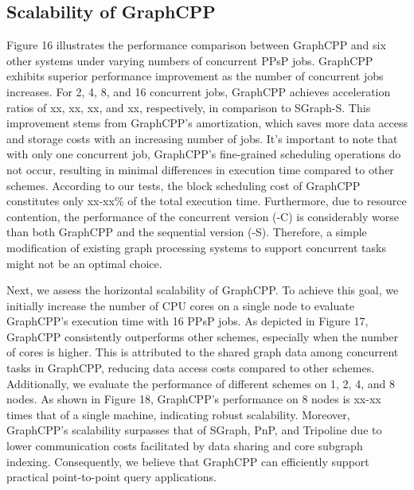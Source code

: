\documentclass[lettersize,journal]{IEEEtran} %
\begin{document}
\subsection{Scalability of GraphCPP}
Figure 16 illustrates the performance comparison between GraphCPP and six other systems under varying numbers of concurrent PPsP jobs. GraphCPP exhibits superior performance improvement as the number of concurrent jobs increases. For 2, 4, 8, and 16 concurrent jobs, GraphCPP achieves acceleration ratios of xx, xx, xx, and xx, respectively, in comparison to SGraph-S. This improvement stems from GraphCPP's amortization, which saves more data access and storage costs with an increasing number of jobs. It's important to note that with only one concurrent job, GraphCPP's fine-grained scheduling operations do not occur, resulting in minimal differences in execution time compared to other schemes. According to our tests, the block scheduling cost of GraphCPP constitutes only xx-xx\% of the total execution time. Furthermore, due to resource contention, the performance of the concurrent version (-C) is considerably worse than both GraphCPP and the sequential version (-S). Therefore, a simple modification of existing graph processing systems to support concurrent tasks might not be an optimal choice.

Next, we assess the horizontal scalability of GraphCPP. To achieve this goal, we initially increase the number of CPU cores on a single node to evaluate GraphCPP's execution time with 16 PPsP jobs. As depicted in Figure 17, GraphCPP consistently outperforms other schemes, especially when the number of cores is higher. This is attributed to the shared graph data among concurrent tasks in GraphCPP, reducing data access costs compared to other schemes. Additionally, we evaluate the performance of different schemes on 1, 2, 4, and 8 nodes. As shown in Figure 18, GraphCPP's performance on 8 nodes is xx-xx times that of a single machine, indicating robust scalability. Moreover, GraphCPP's scalability surpasses that of SGraph, PnP, and Tripoline due to lower communication costs facilitated by data sharing and core subgraph indexing. Consequently, we believe that GraphCPP can efficiently support practical point-to-point query applications.
\end{document}
